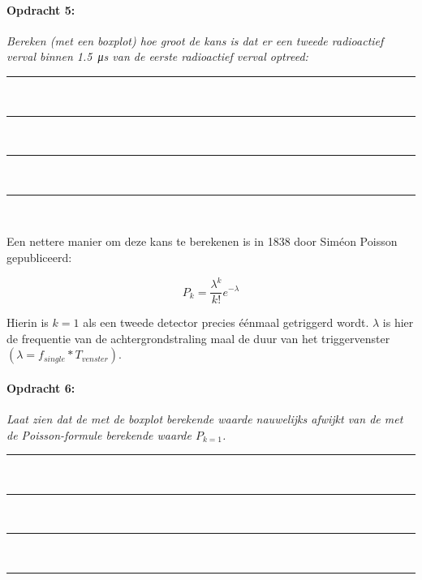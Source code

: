 \begin{minipage}[t]{1\columnwidth}%

\paragraph{Opdracht 5:}

\textit{Bereken (met een boxplot) hoe groot de kans is dat er een
tweede radioactief verval binnen \SI{1.5}{\micro\second} van de eerste
radioactief verval optreed:}

\begin{center}
    \rule{\textwidth}{0.3mm}\\
    \rule{\textwidth}{0.3mm}\\
    \rule{\textwidth}{0.3mm}\\
    \rule{\textwidth}{0.3mm}\\
\end{center}
\end{minipage}

\bigskip{}

Een nettere manier om deze kans te berekenen is in 1838 door Siméon
Poisson \cite{wiki} gepubliceerd:

\begin{equation}
    P_{k}=\frac{\lambda^{k}}{k!}e^{-\lambda}
\end{equation}

Hierin is $k=1$ als een tweede detector precies éénmaal getriggerd
wordt. $\lambda$ is hier de frequentie van de achtergrondstraling
maal de duur van het triggervenster $\left(\lambda=f_{single}*T_{venster}\right)$. 

\begin{minipage}[t]{1\columnwidth}%

\paragraph{Opdracht 6:}

\textit{Laat zien dat de met de boxplot berekende waarde nauwelijks
afwijkt van de met de Poisson-formule berekende waarde $P_{k=1}$.}

\begin{center}
    \rule{\textwidth}{0.3mm}\\
    \rule{\textwidth}{0.3mm}\\
    \rule{\textwidth}{0.3mm}\\
    \rule{\textwidth}{0.3mm}\\
\end{center}
\end{minipage}

